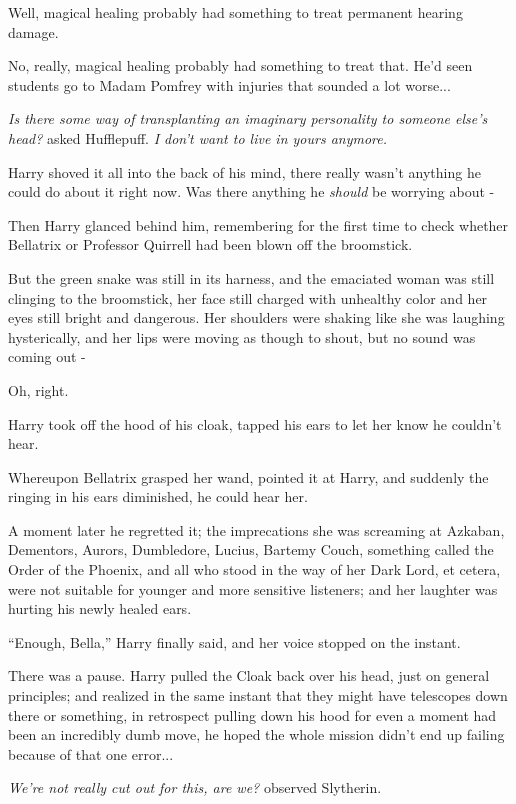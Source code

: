 Well, magical healing probably had something to treat permanent hearing damage.

No, really, magical healing probably had something to treat that. He'd seen students go to Madam Pomfrey with injuries that sounded a lot worse...

\emph{Is there some way of transplanting an imaginary personality to someone else's head?} asked Hufflepuff. \emph{I don't want to live in yours anymore.}

Harry shoved it all into the back of his mind, there really wasn't anything he could do about it right now. Was there anything he \emph{should} be worrying about -

Then Harry glanced behind him, remembering for the first time to check whether Bellatrix or Professor Quirrell had been blown off the broomstick.

But the green snake was still in its harness, and the emaciated woman was still clinging to the broomstick, her face still charged with unhealthy color and her eyes still bright and dangerous. Her shoulders were shaking like she was laughing hysterically, and her lips were moving as though to shout, but no sound was coming out -

Oh, right.

Harry took off the hood of his cloak, tapped his ears to let her know he couldn't hear.

Whereupon Bellatrix grasped her wand, pointed it at Harry, and suddenly the ringing in his ears diminished, he could hear her.

A moment later he regretted it; the imprecations she was screaming at Azkaban, Dementors, Aurors, Dumbledore, Lucius, Bartemy Couch, something called the Order of the Phoenix, and all who stood in the way of her Dark Lord, et cetera, were not suitable for younger and more sensitive listeners; and her laughter was hurting his newly healed ears.

``Enough, Bella,'' Harry finally said, and her voice stopped on the instant.

There was a pause. Harry pulled the Cloak back over his head, just on general principles; and realized in the same instant that they might have telescopes down there or something, in retrospect pulling down his hood for even a moment had been an incredibly dumb move, he hoped the whole mission didn't end up failing because of that one error...

\emph{We're not really cut out for this, are we?} observed Slytherin.

